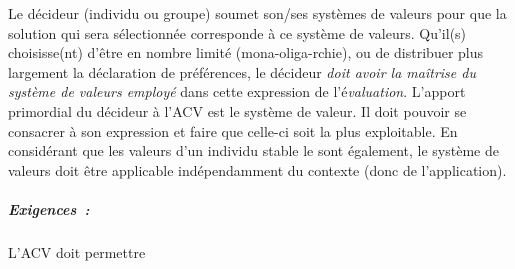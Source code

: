    Le décideur (individu ou groupe) soumet son/ses systèmes de valeurs pour que la solution qui sera sélectionnée corresponde à ce système de valeurs.
   Qu'il(s) choisisse(nt) d'être en nombre limité (mona-oliga-rchie), ou de distribuer plus largement la déclaration de préférences,
   le décideur \emph{doit avoir la maîtrise du système de valeurs employé} dans cette expression de l'é\emph{valuation}.
   L'apport primordial du décideur à l'\gls{ACV} est le système de valeur.
   Il doit pouvoir se consacrer à son expression et faire que celle-ci soit la plus exploitable.
   En considérant que les valeurs d'un individu stable le sont également, le système de valeurs doit être applicable indépendamment du contexte (donc de l'application).
      
 \subparagraph{Exigences~:}
 
 L'\gls{ACV} doit permettre
 
